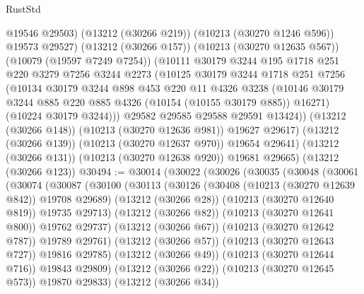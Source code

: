 \begin{lexlean}{RustStd}
\begin{coremodule}
                @19546
                @29503)
              (@13212 (@30266 @219))
              (@10213 (@30270 @1246 @596))
              @19573
              @29527)
            (@13212 (@30266 @157))
            (@10213 (@30270 @12635 @567))
            (@10079 (@19597 @7249 @7254))
            (@10111
              @30179
              @3244
              @195
              @1718
              @251
              @220
              @3279
              @7256
              @3244
              @2273
              (@10125
                @30179
                @3244
                @1718
                @251
                @7256
                (@10134
                  @30179
                  @3244
                  @898
                  @453
                  @220
                  @11
                  @4326
                  @3238
                  (@10146 @30179 @3244 @885 @220 @885 @4326 (@10154 (@10155 @30179 @885)) @16271)
                  (@10224 @30179 @3244)))
              @29582
              @29585
              @29588
              @29591
              @13424))
          (@13212 (@30266 @148))
          (@10213 (@30270 @12636 @981))
          @19627
          @29617)
        (@13212 (@30266 @139))
        (@10213 (@30270 @12637 @970))
        @19654
        @29641)
      (@13212 (@30266 @131))
      (@10213 (@30270 @12638 @920))
      @19681
      @29665)
    (@13212 (@30266 @123))
@30494 := @30014
    (@30022
      (@30026
        (@30035
          (@30048
            (@30061
              (@30074
                (@30087
                  (@30100
                    (@30113
                      (@30126
                        (@30408 (@10213 (@30270 @12639 @842)) @19708 @29689)
                        (@13212 (@30266 @28))
                        (@10213 (@30270 @12640 @819))
                        @19735
                        @29713)
                      (@13212 (@30266 @82))
                      (@10213 (@30270 @12641 @800))
                      @19762
                      @29737)
                    (@13212 (@30266 @67))
                    (@10213 (@30270 @12642 @787))
                    @19789
                    @29761)
                  (@13212 (@30266 @57))
                  (@10213 (@30270 @12643 @727))
                  @19816
                  @29785)
                (@13212 (@30266 @49))
                (@10213 (@30270 @12644 @716))
                @19843
                @29809)
              (@13212 (@30266 @22))
              (@10213 (@30270 @12645 @573))
              @19870
              @29833)
            (@13212 (@30266 @34))

\end{coremodule}
\end{lexlean}
